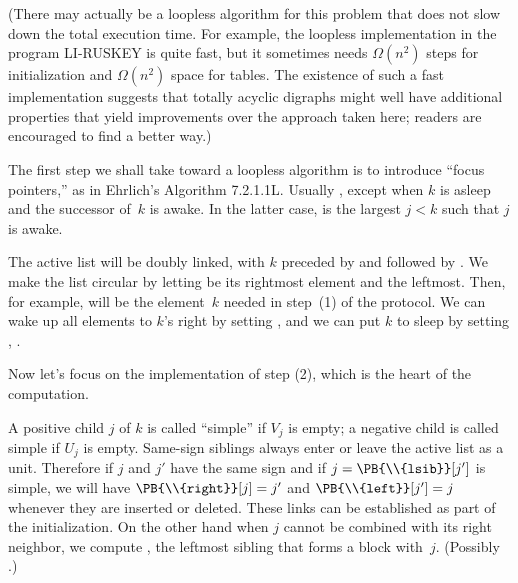 (There may actually be a loopless algorithm for this problem that does not
slow down the total execution time. For example, the loopless implementation
in the program {\mc LI-RUSKEY} is quite fast, but it sometimes needs
$\Omega(n^2)$ steps for initialization and $\Omega(n^2)$ space for tables.
The existence of such a fast implementation suggests that
totally acyclic digraphs might well have additional properties that
yield improvements over the approach taken here; readers are encouraged to
find a better way.)

The first step we shall take toward a loopless algorithm is to introduce
``focus pointers,'' as in Ehrlich's Algorithm 7.2.1.1L. Usually ,
except when $k$ is asleep and the successor of~$k$ is awake. In the latter
case,  is the largest $j<k$ such that $j$ is awake.

The active list will be doubly linked, with $k$ preceded by 
and
followed by . We make the list circular by letting  be its
rightmost element and  the leftmost. Then, for example,
 will be the element~$k$ needed in step~(1) of
the protocol.
We can wake up all elements to $k$'s right by setting
, and we can put $k$ to sleep
by setting
, .

\fi

Now let's focus on the implementation of step (2), which
is the
heart of the computation.

A positive child $j$ of $k$ is called ``simple'' if $V_j$ is empty; a
negative child is called simple if $U_j$ is empty. Same-sign siblings always
enter or leave the active list as a unit. Therefore if $j$ and $j'$ have the
same sign and if $j=\PB{\\{lsib}}[j']$ is simple,  we will have $\PB{%
\\{right}}[j]=j'$ and
$\PB{\\{left}}[j']=j$ whenever they are inserted or deleted. These links can be
established as part of the initialization. On the other hand when $j$
cannot be combined with its right neighbor, we compute ,
the
leftmost sibling that forms a block with~$j$. (Possibly .)

